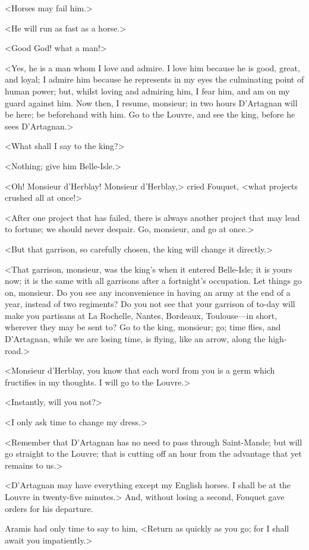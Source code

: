 <Horses may fail him.>

<He will run as fast as a horse.>

<Good God! what a man!>

<Yes, he is a man whom I love and admire. I love him because he is good, great, and loyal; I admire him because he represents in my eyes the culminating point of human power; but, whilst loving and admiring him, I fear him, and am on my guard against him. Now then, I resume, monsieur; in two hours D'Artagnan will be here; be beforehand with him. Go to the Louvre, and see the king, before he sees D'Artagnan.>

<What shall I say to the king?>

<Nothing; give him Belle-Isle.>

<Oh! Monsieur d'Herblay! Monsieur d'Herblay,> cried Fouquet, <what projects crushed all at once!>

<After one project that has failed, there is always another project that may lead to fortune; we should never despair. Go, monsieur, and go at once.>

<But that garrison, so carefully chosen, the king will change it directly.>

<That garrison, monsieur, was the king's when it entered Belle-Isle; it is yours now; it is the same with all garrisons after a fortnight's occupation. Let things go on, monsieur. Do you see any inconvenience in having an army at the end of a year, instead of two regiments? Do you not see that your garrison of to-day will make you partisans at La Rochelle, Nantes, Bordeaux, Toulouse—in short, wherever they may be sent to? Go to the king, monsieur; go; time flies, and D'Artagnan, while we are losing time, is flying, like an arrow, along the high-road.>

<Monsieur d'Herblay, you know that each word from you is a germ which fructifies in my thoughts. I will go to the Louvre.>

<Instantly, will you not?>

<I only ask time to change my dress.>

<Remember that D'Artagnan has no need to pass through Saint-Mande; but will go straight to the Louvre; that is cutting off an hour from the advantage that yet remains to us.>

<D'Artagnan may have everything except my English horses. I shall be at the Louvre in twenty-five minutes.> And, without losing a second, Fouquet gave orders for his departure.

Aramis had only time to say to him, <Return as quickly as you go; for I shall await you impatiently.>

